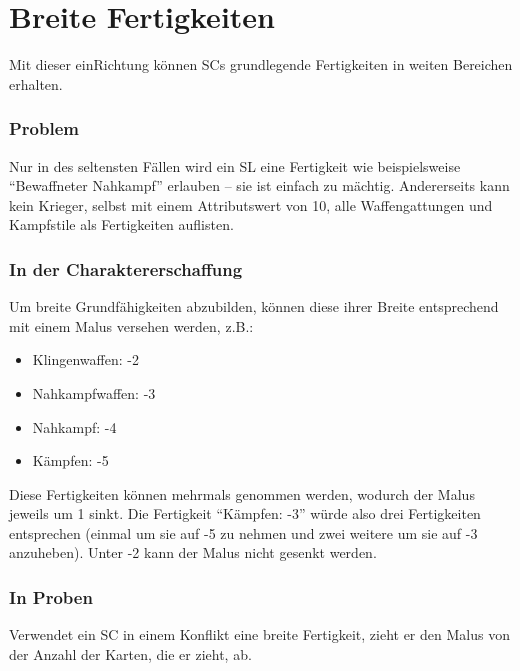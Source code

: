 \section{Breite Fertigkeiten}
Mit dieser einRichtung können SCs grundlegende Fertigkeiten in weiten Bereichen erhalten.
\subsubsection{Problem}
Nur in des seltensten Fällen wird ein SL eine Fertigkeit wie beispielsweise "`Bewaffneter Nahkampf"' erlauben -- sie ist einfach zu mächtig. Andererseits kann kein Krieger, selbst mit einem Attributswert von 10, alle Waffengattungen und Kampfstile als Fertigkeiten auflisten.

\subsubsection{In der Charaktererschaffung}
Um breite Grundfähigkeiten abzubilden, können diese ihrer Breite entsprechend mit einem Malus versehen werden, z.B.:
\begin{itemize}
\item Klingenwaffen: -2
\item Nahkampfwaffen: -3
\item Nahkampf: -4
\item Kämpfen: -5
\end{itemize}
Diese Fertigkeiten können mehrmals genommen werden, wodurch der Malus jeweils um 1 sinkt. Die Fertigkeit "`Kämpfen: -3"' würde also drei Fertigkeiten entsprechen (einmal um sie auf -5 zu nehmen und zwei weitere um sie auf -3 anzuheben). Unter -2 kann der Malus nicht gesenkt werden.

\subsubsection{In Proben}
Verwendet ein SC in einem Konflikt eine breite Fertigkeit, zieht er den Malus von der Anzahl der Karten, die er zieht, ab.


